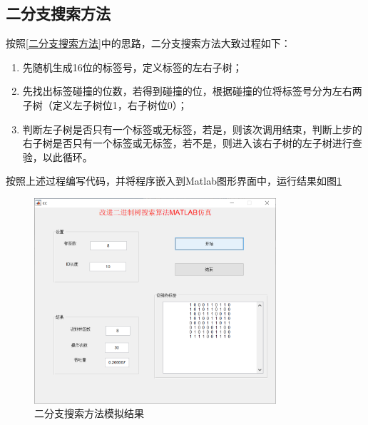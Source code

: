 \documentclass[a4paper]{ctexart}
\begin{document}
\subsection{二分支搜索方法}
按照\ref{二分支搜索方法}中的思路，二分支搜索方法大致过程如下：
\begin{enumerate}
	\item 先随机生成16位的标签号，定义标签的左右子树；
	\item 先找出标签碰撞的位数，若得到碰撞的位，根据碰撞的位将标签号分为左右两子树（定义左子树位1，右子树位0）；
	\item 判断左子树是否只有一个标签或无标签，若是，则该次调用结束，判断上步的右子树是否只有一个标签或无标签，若不是，则进入该右子树的左子树进行查验，以此循环。
\end{enumerate}
按照上述过程编写代码，并将程序嵌入到Matlab图形界面中，运行结果如图\ref{fig:3}
\begin{figure}[htbp]
	\centering
	\includegraphics[width=0.8\textwidth]{figure/1.png}
	\caption{二分支搜索方法模拟结果}\label{fig:3}
\end{figure}

\newpage
\appendix
\appendixpage
\end{document}
